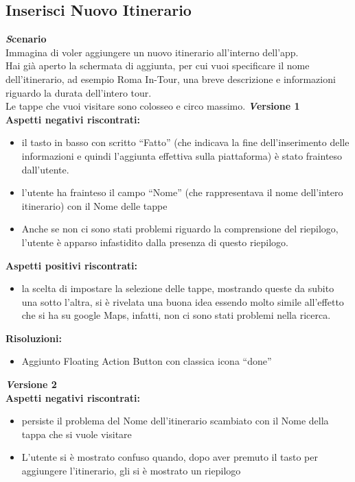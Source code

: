 \subsection{Inserisci Nuovo Itinerario}
\textbf{\emph Scenario}\\
Immagina di voler aggiungere un nuovo itinerario all’interno dell’app.\\
Hai già aperto la schermata di aggiunta, per cui vuoi specificare il nome dell’itinerario, ad esempio Roma In-Tour, una breve descrizione e informazioni riguardo la durata dell’intero tour.\\
Le tappe che vuoi visitare sono colosseo e circo massimo.
\newline
\textbf{\emph Versione 1}\\
\textbf{Aspetti negativi riscontrati:}
\begin{itemize}[label=-]

\item il tasto in basso con scritto “Fatto” (che indicava la fine dell’inserimento delle
informazioni e quindi l’aggiunta effettiva sulla piattaforma) è stato frainteso
dall’utente.
\item l’utente ha frainteso il campo “Nome” (che rappresentava il nome dell’intero
itinerario) con il Nome delle tappe
\item Anche se non ci sono stati problemi riguardo la comprensione del riepilogo,
l’utente è apparso infastidito dalla presenza di questo riepilogo.

\end{itemize}

\textbf{Aspetti positivi riscontrati:}
\begin{itemize}[label=-]

\item la scelta di impostare la selezione delle tappe, mostrando queste da subito
una sotto l’altra, si è rivelata una buona idea essendo molto simile all’effetto
che si ha su google Maps, infatti, non ci sono stati problemi nella ricerca.

\end{itemize}

\textbf{Risoluzioni:}
\begin{itemize}[label=-]

\item Aggiunto Floating Action Button con classica icona “done”

\end{itemize}

\textbf{\emph Versione 2}\\
\textbf{Aspetti negativi riscontrati:}
\begin{itemize}[label=-]

\item persiste il problema del Nome dell’itinerario scambiato con il Nome della
tappa che si vuole visitare
\item L’utente si è mostrato confuso quando, dopo aver premuto il tasto per aggiungere l’itinerario, gli si è mostrato un riepilogo

\end{itemize}

